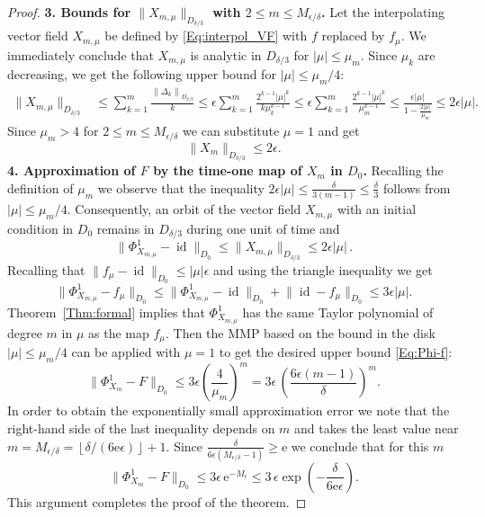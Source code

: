 \documentclass[10pt,a4paper]{amsart}
\begin{document}
\begin{proof}
{\bf 3. Bounds for $\bigl\|X_{m,\mu}\bigr\|_{D_{\delta/3}}$ with $2\le m\le M_{\epsilon/\delta}$.}
Let the interpolating vector field $X_{m,\mu}$ be defined 
by \eqref{Eq:interpol_VF} with $f$ replaced by $f_\mu$.
We immediately conclude that 
  $X_{m,\mu}$ is analytic in $D_{\delta/3}$
for $|\mu|\le \mu_{m}$. Since $\mu_k$ are decreasing, 
we get  the following upper bound 
for  $|\mu|\le \mu_m/4$:
\[
\begin{split}
 \bigl\|X_{m,\mu}\bigr\|_{D_{\delta/3}}
&
\le\sum_{k=1}^m \frac{ \left\|\Delta_k\right\|_{D_{\delta/3}}}{k}
\le
\epsilon\sum_{k=1}^m \frac
{2^{k-1}|\mu|^k}
{k\mu_{k}^{k-1}} 
\le
\epsilon\sum_{k=1}^m \frac
{2^{k-1}|\mu|^k}
{\mu_{m}^{k-1}} 
\le
\frac{\epsilon |\mu|}{1-\frac{2|\mu|}{\mu_m}}
\le 
2\epsilon |\mu|.
\end{split}
\]
Since $\mu_m>4$ for $2\le m\le M_{\epsilon/\delta}$  we can substitute $\mu=1$ and get
\[
\|X_{m}\|_{D_{\delta/3}}\le 2 \epsilon.
\]
{\bf 4. Approximation of $F$ by the time-one map of $X_{m}$ in $D_0$.}
Recalling the definition of $\mu_m$ we observe that the inequality 
\(
2\epsilon|\mu|
 \le\frac{\delta}{3(m-1)}\le\frac{\delta}{3}
\) follows from $|\mu|\le \mu_m/4$.
Consequently, an orbit of the vector field $X_{m,\mu}$ with an initial condition  in $D_0$ remains in $D_{\delta/3}$ during one unit of time and
$$
\bigl\|\Phi^1_{X_{m,\mu}}-\operatorname{id} \bigr\|_{D_0}\le \|X_{m,\mu}\|_{D_{\delta/3}}\le 2\epsilon|\mu|\,.
$$
Recalling that  $\|f_\mu - \operatorname{id} \|_{D_0} 
 \leq |\mu| \epsilon$ and using the triangle inequality we get
$$
\bigl\|\Phi^1_{X_{m,\mu}}-f_\mu \bigr\|_{D_0}\le \bigl\|\Phi^1_{X_{m,\mu}}-\operatorname{id} \bigr\|_{D_0}+\bigl\|\operatorname{id} -f_\mu \bigr\|_{D_0} \le 
3\epsilon|\mu|.
$$
Theorem~\ref{Thm:formal} implies that
$\Phi^1_{X_{m,\mu}}$ has the same Taylor polynomial of degree $m$ in $\mu$ as the map
 $f_\mu$. Then
the MMP  based on the bound in the disk 
$|\mu|\le \mu_m/4$ can be applied with $\mu=1$ to get the desired upper bound \eqref{Eq:Phi-f}:
\[
\bigl\|\Phi^1_{X_{m}}-F \bigr\|_{D_0}  
\le   3\epsilon \left( \frac{ 4}{\mu_{m}}\right)^{m}
=
 3\epsilon\,\left(  \frac{6\epsilon (m-1)}{\delta}\right)^{m} .
\]
In order to obtain the exponentially small approximation error we note that the right-hand side 
of the last inequality depends on $m$ and takes the least value 
 near  
$m=M_{{\epsilon/\delta}}=\left\lfloor \delta/(6 \mathrm e\epsilon)\right\rfloor+1$.
Since
 \(
\frac{\delta}{6\epsilon (M_{\epsilon/\delta}-1)}
\ge \mathrm e
\)
we conclude that for this $m$
$$
\bigl\|\Phi^1_{X_m}-F \bigr\|_{D_0} 
\le 3 \epsilon \, \mathrm e^{-M_\epsilon} 
\le 3  \,
\epsilon
\exp
\left(-
\frac{\delta}{6\mathrm e \epsilon}
\right).
$$
This argument completes the proof of the theorem.
\end{proof}
\end{document}
